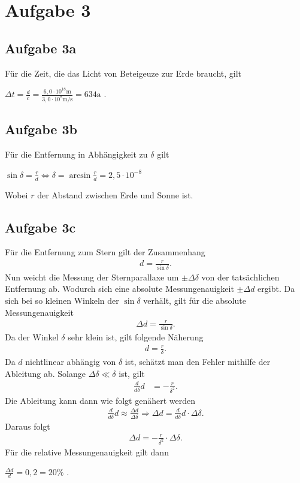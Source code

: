 \documentclass[a4paper,11pt]{article}
\begin{document}
\section{Aufgabe 3}

\subsection{Aufgabe 3a}
Für die Zeit, die das Licht von Beteigeuze zur Erde braucht, gilt 
\begin{center}
  $\Delta t = \frac{d}{c} = \frac{6,0 \cdot 10^{18}\mbox{m}}{3,0 \cdot 10^8 \mbox{m/s}} = 634\mbox{a}$ .
\end{center}

\subsection{Aufgabe 3b}
Für die Entfernung in Abhängigkeit zu $\delta$ gilt
\begin{center}
  $
    \sin \delta = \frac{r}{d} \Leftrightarrow 
    \delta     = \arcsin\frac{r}{d} = 2,5 \cdot 10^{-8}
  $
\end{center}
Wobei $r$ der Abstand zwischen Erde und Sonne ist.

\subsection{Aufgabe 3c}
Für die Entfernung zum Stern gilt der Zusammenhang
\begin{align*}
  d = \frac{r}{\sin \delta} \mbox{.}
\end{align*}
Nun weicht die Messung der Sternparallaxe um $\pm\Delta\delta$ von der tatsächlichen Entfernung ab. Wodurch sich eine absolute Messungenauigkeit $\pm\Delta d$ ergibt. Da sich bei so kleinen Winkeln der $\sin \delta$ verhält, gilt für die absolute Messungenauigkeit
\begin{align*}
  \Delta d = \frac{r}{\sin\delta } \mbox{.}
\end{align*}
Da der Winkel $\delta$ sehr klein ist, gilt folgende Näherung
\begin{align*}
  d = \frac{r}{\delta} \mbox{.}
\end{align*}
Da $d$ nichtlinear abhängig von $\delta$ ist, schätzt man den Fehler mithilfe der Ableitung ab. Solange $\Delta\delta \ll \delta$ ist, gilt
\begin{align*}
  \frac{d}{d \delta} d &= -\frac{r}{\delta^{2}} \mbox{.}
\end{align*}
Die Ableitung kann dann wie folgt genähert werden
\begin{align*}
  \frac{d}{d \delta} d \approx \frac{\Delta d}{\Delta \delta} \Rightarrow 
  \Delta d = \frac{d}{d\delta} d \cdot \Delta \delta \mbox{.}
\end{align*}
Daraus folgt
\begin{align*}
  \Delta d = -\frac{r}{\delta^{2}} \cdot \Delta \delta \mbox{.}
\end{align*}
Für die relative Messungenauigkeit gilt dann
\begin{center}
  $
    \frac{\Delta d}{d} = 0,2 = 20 \mbox{\%}
  $ .
\end{center}
\end{document}
